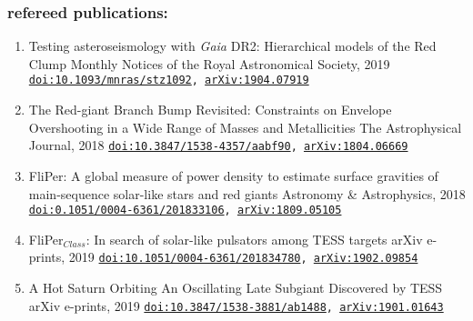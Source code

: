 \documentclass[]{k-cv} %
\begin{document}
\subsubsection*{\color{c3}refereed publications:}
\vspace{-0.2cm}
\begin{enumerate}
	\item {}
	{Testing asteroseismology with \textit{Gaia} DR2: Hierarchical models of the Red Clump}
	{Monthly Notices of the Royal Astronomical Society, 2019}
	{\texttt{\href{https://academic.oup.com/mnras/article-abstract/486/3/3569/5475128}{doi:10.1093/mnras/stz1092}, \href{https://arxiv.org/abs/1904.07919}{arXiv:1904.07919}}}
	
	\item {}
	{The Red-giant Branch Bump Revisited: Constraints on Envelope Overshooting in a Wide Range of Masses and Metallicities}
	{The Astrophysical Journal, 2018}
	{\texttt{\href{https://iopscience.iop.org/article/10.3847/1538-4357/aabf90}{doi:10.3847/1538-4357/aabf90}, \href{https://arxiv.org/abs/1804.06669}{arXiv:1804.06669}}}
	
	\item {}
	{FliPer: A global measure of power density to estimate surface gravities of main-sequence solar-like stars and red giants}
	{Astronomy \& Astrophysics, 2018}
	{\texttt{\href{https://www.aanda.org/articles/aa/abs/2018/12/aa33106-18/aa33106-18.html}{doi:0.1051/0004-6361/201833106}, \href{https://arxiv.org/abs/1809.05105}{arXiv:1809.05105}}}
	
	\item {}
	{FliPer$_{Class}$: In search of solar-like pulsators among TESS targets}
	{arXiv e-prints, 2019}
	{\texttt{\href{https://www.aanda.org/articles/aa/abs/2019/04/aa34780-18/aa34780-18.html}{doi:10.1051/0004-6361/201834780}, \href{https://arxiv.org/abs/1902.09854}{arXiv:1902.09854}}}
	
	\item {}
	{{A Hot Saturn Orbiting An Oscillating Late Subgiant Discovered by TESS}}
	{arXiv e-prints, 2019}
	{\texttt{\href{https://iopscience.iop.org/article/10.3847/1538-3881/ab1488}{doi:10.3847/1538-3881/ab1488}, \href{https://arxiv.org/abs/1901.01643}{arXiv:1901.01643}}}
	

\end{enumerate}
\end{document}
